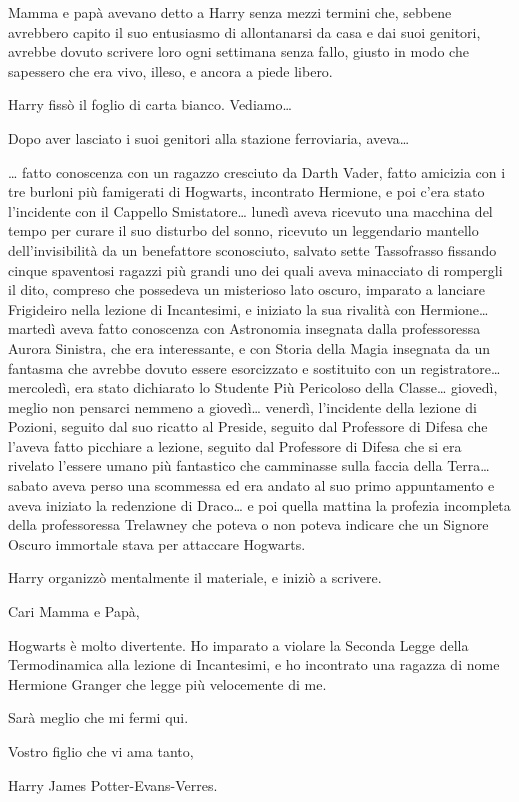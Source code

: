 Mamma e papà avevano detto a Harry senza mezzi termini che, sebbene avrebbero capito il suo entusiasmo di allontanarsi da casa e dai suoi genitori, avrebbe dovuto scrivere loro ogni settimana senza fallo, giusto in modo che sapessero che era vivo, illeso, e ancora a piede libero.

Harry fissò il foglio di carta bianco. Vediamo…

Dopo aver lasciato i suoi genitori alla stazione ferroviaria, aveva…

… fatto conoscenza con un ragazzo cresciuto da Darth Vader, fatto amicizia con i tre burloni più famigerati di Hogwarts, incontrato Hermione, e poi c’era stato l’incidente con il Cappello Smistatore… lunedì aveva ricevuto una macchina del tempo per curare il suo disturbo del sonno, ricevuto un leggendario mantello dell’invisibilità da un benefattore sconosciuto, salvato sette Tassofrasso fissando cinque spaventosi ragazzi più grandi uno dei quali aveva minacciato di rompergli il dito, compreso che possedeva un misterioso lato oscuro, imparato a lanciare Frigideiro nella lezione di Incantesimi, e iniziato la sua rivalità con Hermione… martedì aveva fatto conoscenza con Astronomia insegnata dalla professoressa Aurora Sinistra, che era interessante, e con Storia della Magia insegnata da un fantasma che avrebbe dovuto essere esorcizzato e sostituito con un registratore… mercoledì, era stato dichiarato lo Studente Più Pericoloso della Classe… giovedì, meglio non pensarci nemmeno a giovedì… venerdì, l’incidente della lezione di Pozioni, seguito dal suo ricatto al Preside, seguito dal Professore di Difesa che l’aveva fatto picchiare a lezione, seguito dal Professore di Difesa che si era rivelato l’essere umano più fantastico che camminasse sulla faccia della Terra… sabato aveva perso una scommessa ed era andato al suo primo appuntamento e aveva iniziato la redenzione di Draco… e poi quella mattina la profezia incompleta della professoressa Trelawney che poteva o non poteva indicare che un Signore Oscuro immortale stava per attaccare Hogwarts.

Harry organizzò mentalmente il materiale, e iniziò a scrivere.

Cari Mamma e Papà,

Hogwarts è molto divertente. Ho imparato a violare la Seconda Legge della Termodinamica alla lezione di Incantesimi, e ho incontrato una ragazza di nome Hermione Granger che legge più velocemente di me.

Sarà meglio che mi fermi qui.

Vostro figlio che vi ama tanto,

Harry James Potter-Evans-Verres.



